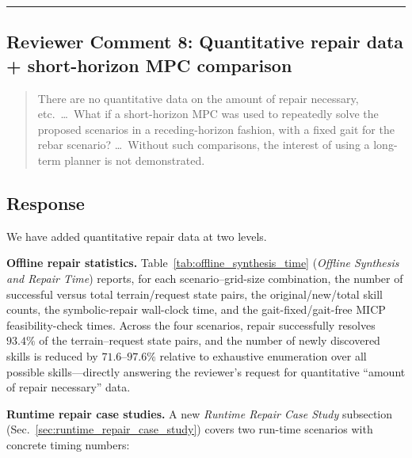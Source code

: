 \noindent\rule{17cm}{2.0pt}

\subsection{Reviewer Comment 8: Quantitative repair data + short-horizon MPC comparison}
\begin{mdframed}
\begin{quote}
There are no quantitative data on the amount of repair necessary, etc.\ \ldots\ What if a short-horizon MPC was used to repeatedly solve the proposed scenarios in a receding-horizon fashion, with a fixed gait for the rebar scenario? \ldots\ Without such comparisons, the interest of using a long-term planner is not demonstrated.
\end{quote}
\end{mdframed}

\subsection{Response}
We have added quantitative repair data at two levels.

\noindent \textbf{Offline repair statistics.} Table~\ref{tab:offline_synthesis_time} (\textit{Offline Synthesis and Repair Time}) reports, for each scenario--grid-size combination, the number of successful versus total terrain/request state pairs, the original/new/total skill counts, the symbolic-repair wall-clock time, and the gait-fixed/gait-free MICP feasibility-check times. Across the four scenarios, repair successfully resolves $93.4\%$ of the terrain--request state pairs, and the number of newly discovered skills is reduced by $71.6$--$97.6\%$ relative to exhaustive enumeration over all possible skills---directly answering the reviewer's request for quantitative ``amount of repair necessary'' data.

\noindent \textbf{Runtime repair case studies.} A new \textit{Runtime Repair Case Study} subsection (Sec.~\ref{sec:runtime_repair_case_study}) covers two run-time scenarios with concrete timing numbers:

\textit{}

\textit{}

